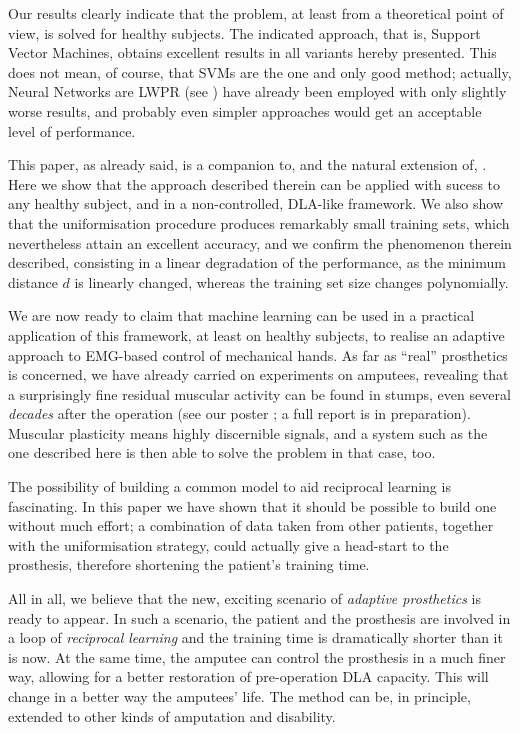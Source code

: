 Our results clearly indicate that the problem, at least from a
theoretical point of view, is solved for healthy subjects. The
indicated approach, that is, Support Vector Machines, obtains
excellent results in all variants hereby presented. This does not
mean, of course, that SVMs are the one and only good method; actually,
Neural Networks are LWPR (see \cite{lwpr}) have already been employed
with only slightly worse results, and probably even simpler approaches
would get an acceptable level of performance.

This paper, as already said, is a companion to, and the natural
extension of, \cite{2008.ICRA,2008.BioCyb}. Here we show that the
approach described therein can be applied with sucess to any healthy
subject, and in a non-controlled, DLA-like framework. We also show
that the uniformisation procedure produces remarkably small training
sets, which nevertheless attain an excellent accuracy, and we confirm
the phenomenon therein described, consisting in a linear degradation
of the performance, as the minimum distance $d$ is linearly changed,
whereas the training set size changes polynomially.

We are now ready to claim that machine learning can be used in a
practical application of this framework, at least on healthy subjects,
to realise an adaptive approach to EMG-based control of mechanical
hands. As far as ``real'' prosthetics is concerned, we have already
carried on experiments on amputees, revealing that a surprisingly fine
residual muscular activity can be found in stumps, even several
\emph{decades} after the operation (see our poster
\cite{2008.Neurorob}; a full report is in preparation). Muscular
plasticity means highly discernible signals, and a system such as the
one described here is then able to solve the problem in that case,
too.

The possibility of building a common model to aid reciprocal learning
is fascinating. In this paper we have shown that it should be possible
to build one without much effort; a combination of data taken from
other patients, together with the uniformisation strategy, could
actually give a head-start to the prosthesis, therefore shortening the
patient's training time.

All in all, we believe that the new, exciting scenario of
\emph{adaptive prosthetics} is ready to appear. In such a scenario,
the patient and the prosthesis are involved in a loop of
\emph{reciprocal learning} and the training time is dramatically
shorter than it is now. At the same time, the amputee can control the
prosthesis in a much finer way, allowing for a better restoration of
pre-operation DLA capacity. This will change in a better way the
amputees' life. The method can be, in principle, extended to other
kinds of amputation and disability.

